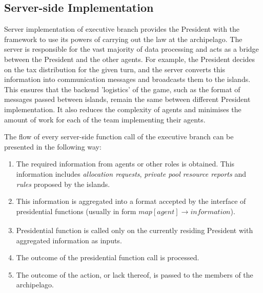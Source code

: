 \subsection{Server-side Implementation}
\label{sub:president:server-side}
Server implementation of executive branch provides the President with the framework to use its powers of carrying out the law at the archipelago. The server is responsible for the vast majority of data processing and acts as a bridge between the President and the other agents. For example, the President decides on the tax distribution for the given turn, and the server converts this information into communication messages and broadcasts them to the islands. This ensures that the backend 'logistics' of the game, such as the format of messages passed between islands, remain the same between different President implementation. It also reduces the complexity of agents and minimises the amount of work for each of the team implementing their agents.

The flow of every server-side function call of the executive branch can be presented in the following way:
\begin{enumerate}
    \item The required information from agents or other roles is obtained. This information includes \emph{allocation requests}, \emph{private pool resource reports} and \emph{rules} proposed by the islands.
    \item This information is aggregated into a format accepted by the interface of presidential functions (usually in form $map[agent] \xrightarrow[]{} information$).
    \item Presidential function is called only on the currently residing President with aggregated information as inputs.
    \item The outcome of the presidential function call is processed.
    \item The outcome of the action, or lack thereof, is passed to the members of the archipelago.
\end{enumerate}


